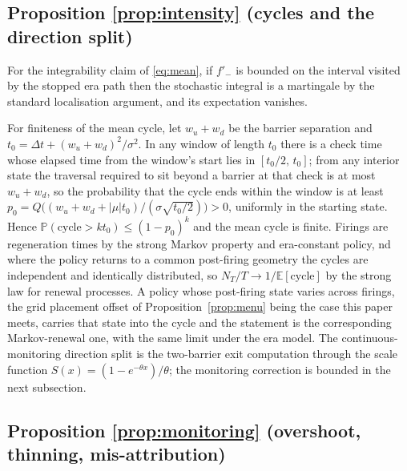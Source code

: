 \documentclass[11pt,a4paper]{article}
\theoremstyle{definition}
\theoremstyle{plain}
\theoremstyle{remark}
\newcommand{\surv}{Q}
\begin{document}
\subsection{Proposition \ref{prop:intensity} (cycles and the direction split)}

For the integrability claim of \eqref{eq:mean}, if $f'_-$ is bounded on the interval visited by the stopped era path then the stochastic integral is a martingale by the 
standard localisation argument,\cite{revuzyor} and its expectation vanishes.

For finiteness of the mean cycle, let $w_u + w_d$ be the barrier separation and $t_0 = \Delta t + (w_u + w_d)^2/\sigma^2$. In any window of length $t_0$ there is a check 
time whose elapsed time from the window's start lies in $[t_0/2,\, t_0]$; from any interior state the traversal required to sit beyond a barrier at that check is at most $w_u + w_d$, so the 
probability that the cycle ends within the window is at least $p_0 = \surv\big((w_u + w_d + |\mu| t_0)/(\sigma\sqrt{t_0/2})\big) > 0$, uniformly in the starting state. 
Hence $\mathbb{P}(\text{cycle} > k t_0) \le (1 - p_0)^k$ and the mean cycle is finite. Firings are regeneration times by the strong Markov property and era-constant policy, 
nd where the policy returns to a common post-firing geometry the cycles are independent and identically distributed, so $N_T/T \to 1/\mathbb{E}[\text{cycle}]$ by the strong 
law for renewal processes. A policy whose post-firing state varies across firings, the grid placement offset of Proposition~\ref{prop:menu} being the case this paper meets, 
carries that state into the cycle and the statement is the corresponding Markov-renewal one, with the same limit under the era model. The continuous-monitoring direction 
split is the two-barrier exit computation through the scale function $S(x) = (1 - e^{-\theta x})/\theta$;\cite{redner2001,borodinsalminen2002} the monitoring correction is 
bounded in the next subsection.

\subsection{Proposition \ref{prop:monitoring} (overshoot, thinning, mis-attribution)}
\end{document}
